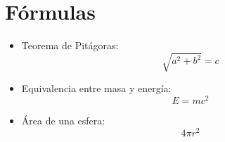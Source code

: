 \documentclass[a4paper,11pt]{article}
\begin{document}
\section{Fórmulas}

\begin{itemize}
	\item Teorema de Pitágoras: $$\sqrt{a^2 + b^2} = c$$
	\item Equivalencia entre masa y energía: $$E = mc^2$$
	\item Área de una esfera: $$4\pi r^2$$
\end{itemize}

\newpage




\nocite{*}
\end{document}

